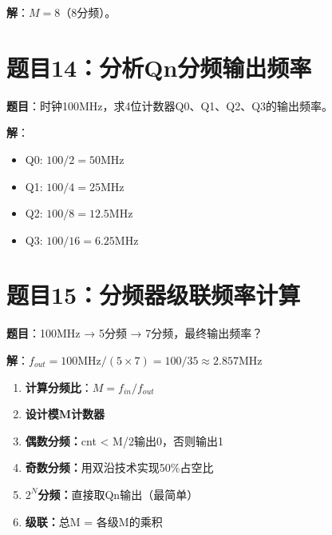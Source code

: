 \textbf{解}：$M = 8$（8分频）。

\section*{题目14：分析Qn分频输出频率}

\textbf{题目}：时钟100MHz，求4位计数器Q0、Q1、Q2、Q3的输出频率。

\textbf{解}：
\begin{itemize}
  \item Q0: $100/2=50$MHz
  \item Q1: $100/4=25$MHz
  \item Q2: $100/8=12.5$MHz
  \item Q3: $100/16=6.25$MHz
\end{itemize}

\section*{题目15：分频器级联频率计算}

\textbf{题目}：100MHz → 5分频 → 7分频，最终输出频率？

\textbf{解}：$f_{out} = 100\text{MHz} / (5 \times 7) = 100/35 \approx 2.857\text{MHz}$

\begin{examtip}[分频器类题目的统一解法]
\begin{enumerate}
  \item \textbf{计算分频比}：$M = f_{in} / f_{out}$
  \item \textbf{设计模M计数器}
  \item \textbf{偶数分频：}cnt < M/2输出0，否则输出1
  \item \textbf{奇数分频：}用双沿技术实现50\%占空比
  \item \textbf{$2^N$分频：}直接取Qn输出（最简单）
  \item \textbf{级联：}总M = 各级M的乘积
\end{enumerate}
\end{examtip}
